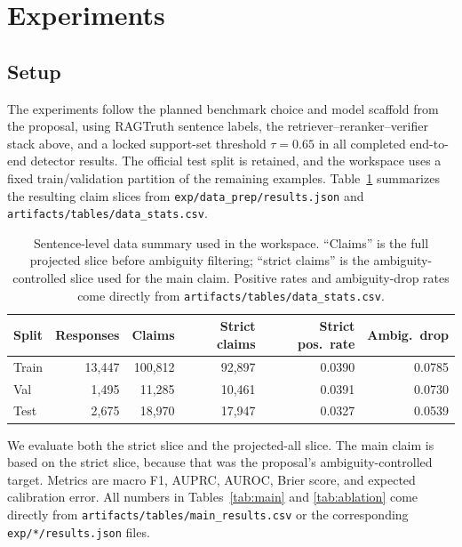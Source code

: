 \documentclass{article}
\newcommand{\tauv}{\tau}
\begin{document}
\section{Experiments}
\label{sec:experiments}
\subsection{Setup}
The experiments follow the planned benchmark choice and model scaffold from the proposal, using RAGTruth sentence labels, the retriever--reranker--verifier stack above, and a locked support-set threshold $\tauv=0.65$ in all completed end-to-end detector results. The official test split is retained, and the workspace uses a fixed train/validation partition of the remaining examples. Table~\ref{tab:data} summarizes the resulting claim slices from \texttt{exp/data\_prep/results.json} and \texttt{artifacts/tables/data\_stats.csv}.

\begin{table}[t]
\caption{Sentence-level data summary used in the workspace. ``Claims'' is the full projected slice before ambiguity filtering; ``strict claims'' is the ambiguity-controlled slice used for the main claim. Positive rates and ambiguity-drop rates come directly from \texttt{artifacts/tables/data\_stats.csv}.}
\label{tab:data}
\centering
\small
\begin{tabular}{lrrrrr}
\toprule
Split & Responses & Claims & Strict claims & Strict pos.\ rate & Ambig.\ drop \\
\midrule
Train & 13{,}447 & 100{,}812 & 92{,}897 & 0.0390 & 0.0785 \\
Val   & 1{,}495 & 11{,}285 & 10{,}461 & 0.0391 & 0.0730 \\
Test  & 2{,}675 & 18{,}970 & 17{,}947 & 0.0327 & 0.0539 \\
\bottomrule
\end{tabular}
\end{table}

We evaluate both the strict slice and the projected-all slice. The main claim is based on the strict slice, because that was the proposal's ambiguity-controlled target. Metrics are macro F1, AUPRC, AUROC, Brier score, and expected calibration error. All numbers in Tables~\ref{tab:main} and \ref{tab:ablation} come directly from \texttt{artifacts/tables/main\_results.csv} or the corresponding \texttt{exp/*/results.json} files.
\end{document}
